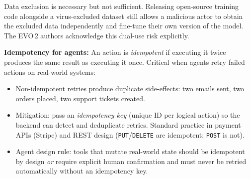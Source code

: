\begin{warnbox}
  Data exclusion is necessary but not sufficient. Releasing open-source training code
  alongside a virus-excluded dataset still allows a malicious actor to obtain the
  excluded data independently and fine-tune their own version of the model. The EVO\,2
  authors acknowledge this dual-use risk explicitly.
\end{warnbox}

\textbf{Idempotency for agents:}
An action is \emph{idempotent} if executing it twice produces the same result as
executing it once. Critical when agents retry failed actions on real-world systems:
\begin{itemize}
  \item Non-idempotent retries produce duplicate side-effects: two emails sent, two
    orders placed, two support tickets created.
  \item Mitigation: pass an \emph{idempotency key} (unique ID per logical action) so
    the backend can detect and deduplicate retries. Standard practice in payment
    APIs (Stripe) and REST design (\texttt{PUT}/\texttt{DELETE} are idempotent;
    \texttt{POST} is not).
  \item Agent design rule: tools that mutate real-world state should be idempotent
    by design \emph{or} require explicit human confirmation and must never be retried
    automatically without an idempotency key.
\end{itemize}

